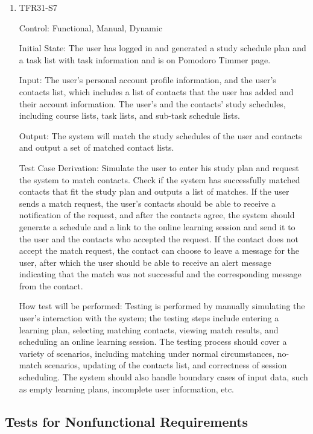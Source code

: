 \documentclass[12pt, titlepage]{article}
\begin{document}
\begin{enumerate}
\item{TFR31-S7\\} \label{TFR31-S7}

Control: Functional, Manual, Dynamic
					
Initial State: The user has logged in and generated a study schedule plan and a task list with task information and is on Pomodoro Timmer page.
					
Input: The user's personal account profile information, and the user's contacts list, which includes a list of contacts that the user has added and their account information. The user's and the contacts' study schedules, including course lists, task lists, and sub-task schedule lists.
					
Output: The system will match the study schedules of the user and contacts and output a set of matched contact lists.

Test Case Derivation: Simulate the user to enter his study plan and request the system to match contacts. Check if the system has successfully matched contacts that fit the study plan and outputs a list of matches. If the user sends a match request, the user's contacts should be able to receive a notification of the request, and after the contacts agree, the system should generate a schedule and a link to the online learning session and send it to the user and the contacts who accepted the request. If the contact does not accept the match request, the contact can choose to leave a message for the user, after which the user should be able to receive an alert message indicating that the match was not successful and the corresponding message from the contact.
					
How test will be performed: Testing is performed by manually simulating the user's interaction with the system; the testing steps include entering a learning plan, selecting matching contacts, viewing match results, and scheduling an online learning session. The testing process should cover a variety of scenarios, including matching under normal circumstances, no-match scenarios, updating of the contacts list, and correctness of session scheduling. The system should also handle boundary cases of input data, such as empty learning plans, incomplete user information, etc.
\end{enumerate}
\subsection{Tests for Nonfunctional Requirements}
\end{document}

